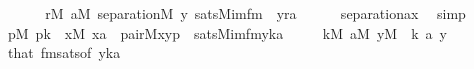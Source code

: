 \begin{isabellebody}
\ \ \isamarkupfalse%
\isanewline
\ \ \isamarkupfalse%
\ {\isachardoublequoteopen}{\isasymforall}r{\isasymin}M{\isachardot}{\kern0pt}\ {\isasymforall}a{\isasymin}M{\isachardot}{\kern0pt}\ separation{\isacharparenleft}{\kern0pt}{\isacharhash}{\kern0pt}{\isacharhash}{\kern0pt}M{\isacharcomma}{\kern0pt}\ {\isasymlambda}y{\isachardot}{\kern0pt}\ sats{\isacharparenleft}{\kern0pt}M{\isacharcomma}{\kern0pt}imfm{\isacharparenleft}{\kern0pt}{}{\isacharcomma}{\kern0pt}{}{\isacharcomma}{\kern0pt}{}{\isacharparenright}{\kern0pt}\ {\isacharcomma}{\kern0pt}\ {\isacharbrackleft}{\kern0pt}y{\isacharcomma}{\kern0pt}r{\isacharcomma}{\kern0pt}a{\isacharbrackright}{\kern0pt}{\isacharparenright}{\kern0pt}{\isacharparenright}{\kern0pt}{\isachardoublequoteclose}\isanewline
\ \ \ \ \isamarkupfalse%
\ separation{\isacharunderscore}{\kern0pt}ax\ \isamarkupfalse%
\ simp\isanewline
\ \ \isamarkupfalse%
\isanewline
\ \ \isamarkupfalse%
\ {\isachardoublequoteopen}{\isacharparenleft}{\kern0pt}{\isasymexists}p{\isasymin}M{\isachardot}{\kern0pt}\ p{\isasymin}k\ {\isacharampersand}{\kern0pt}\ {\isacharparenleft}{\kern0pt}{\isasymexists}x{\isasymin}M{\isachardot}{\kern0pt}\ x{\isasymin}a\ {\isacharampersand}{\kern0pt}\ pair{\isacharparenleft}{\kern0pt}{\isacharhash}{\kern0pt}{\isacharhash}{\kern0pt}M{\isacharcomma}{\kern0pt}x{\isacharcomma}{\kern0pt}y{\isacharcomma}{\kern0pt}p{\isacharparenright}{\kern0pt}{\isacharparenright}{\kern0pt}{\isacharparenright}{\kern0pt}\ {\isasymlongleftrightarrow}\ sats{\isacharparenleft}{\kern0pt}M{\isacharcomma}{\kern0pt}imfm{\isacharparenleft}{\kern0pt}{}{\isacharcomma}{\kern0pt}{}{\isacharcomma}{\kern0pt}{}{\isacharparenright}{\kern0pt}{\isacharcomma}{\kern0pt}{\isacharbrackleft}{\kern0pt}y{\isacharcomma}{\kern0pt}k{\isacharcomma}{\kern0pt}a{\isacharbrackright}{\kern0pt}{\isacharparenright}{\kern0pt}{\isachardoublequoteclose}\isanewline
\ \ \ \ \ {\isachardoublequoteopen}k{\isasymin}M{\isachardoublequoteclose}\ {\isachardoublequoteopen}a{\isasymin}M{\isachardoublequoteclose}\ {\isachardoublequoteopen}y{\isasymin}M{\isachardoublequoteclose}\ \ k\ a\ y\isanewline
\ \ \ \ \isamarkupfalse%
\ that\ fmsats{\isacharbrackleft}{\kern0pt}of\ {\isachardoublequoteopen}{\isacharbrackleft}{\kern0pt}y{\isacharcomma}{\kern0pt}k{\isacharcomma}{\kern0pt}a{\isacharbrackright}{\kern0pt}{\isachardoublequoteclose}{\isacharbrackright}{\kern0pt}\ \isamarkupfalse%

\end{isabellebody}
